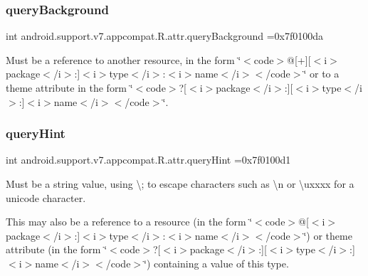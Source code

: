 \subsubsection{\texorpdfstring{query\+Background}{queryBackground}}
{\footnotesize\ttfamily int android.\+support.\+v7.\+appcompat.\+R.\+attr.\+query\+Background =0x7f0100da\hspace{0.3cm}{\ttfamily [static]}}

Must be a reference to another resource, in the form \char`\"{}$<$code$>$@\mbox{[}+\mbox{]}\mbox{[}$<$i$>$package$<$/i$>$\+:\mbox{]}$<$i$>$type$<$/i$>$\+:$<$i$>$name$<$/i$>$$<$/code$>$\char`\"{} or to a theme attribute in the form \char`\"{}$<$code$>$?\mbox{[}$<$i$>$package$<$/i$>$\+:\mbox{]}\mbox{[}$<$i$>$type$<$/i$>$\+:\mbox{]}$<$i$>$name$<$/i$>$$<$/code$>$\char`\"{}. \mbox{\label{classandroid_1_1support_1_1v7_1_1appcompat_1_1R_1_1attr_a8b9b50a850d6c45d35817e80f50f33f4}} 
\subsubsection{\texorpdfstring{query\+Hint}{queryHint}}
{\footnotesize\ttfamily int android.\+support.\+v7.\+appcompat.\+R.\+attr.\+query\+Hint =0x7f0100d1\hspace{0.3cm}{\ttfamily [static]}}

Must be a string value, using \textquotesingle{}\textbackslash{};\textquotesingle{} to escape characters such as \textquotesingle{}\textbackslash{}n\textquotesingle{} or \textquotesingle{}\textbackslash{}uxxxx\textquotesingle{} for a unicode character. 

This may also be a reference to a resource (in the form \char`\"{}$<$code$>$@\mbox{[}$<$i$>$package$<$/i$>$\+:\mbox{]}$<$i$>$type$<$/i$>$\+:$<$i$>$name$<$/i$>$$<$/code$>$\char`\"{}) or theme attribute (in the form \char`\"{}$<$code$>$?\mbox{[}$<$i$>$package$<$/i$>$\+:\mbox{]}\mbox{[}$<$i$>$type$<$/i$>$\+:\mbox{]}$<$i$>$name$<$/i$>$$<$/code$>$\char`\"{}) containing a value of this type. \mbox{\label{classandroid_1_1support_1_1v7_1_1appcompat_1_1R_1_1attr_a39f3d965b1f9c2b0ccff53d00870df43}} 
